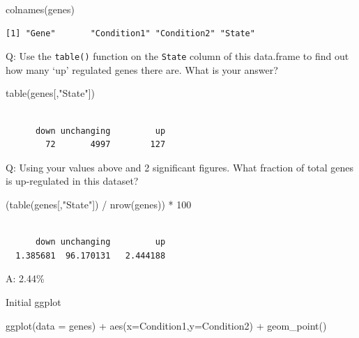 \documentclass[
  letterpaper,
  DIV=11,
  numbers=noendperiod]{scrartcl}
\newenvironment{Shaded}{\begin{snugshade}}{\end{snugshade}}
\newcommand{\AttributeTok}[1]{\textcolor[rgb]{0.40,0.45,0.13}{#1}}
\newcommand{\DecValTok}[1]{\textcolor[rgb]{0.68,0.00,0.00}{#1}}
\newcommand{\FunctionTok}[1]{\textcolor[rgb]{0.28,0.35,0.67}{#1}}
\newcommand{\NormalTok}[1]{\textcolor[rgb]{0.00,0.23,0.31}{#1}}
\newcommand{\SpecialCharTok}[1]{\textcolor[rgb]{0.37,0.37,0.37}{#1}}
\newcommand{\StringTok}[1]{\textcolor[rgb]{0.13,0.47,0.30}{#1}}
\begin{document}
\begin{Shaded}
\begin{Highlighting}[]
\FunctionTok{colnames}\NormalTok{(genes)}
\end{Highlighting}
\end{Shaded}

\begin{verbatim}
[1] "Gene"       "Condition1" "Condition2" "State"     
\end{verbatim}

Q: Use the \texttt{table()} function on the \texttt{State} column of
this data.frame to find out how many `up' regulated genes there are.
What is your answer?

\begin{Shaded}
\begin{Highlighting}[]
\FunctionTok{table}\NormalTok{(genes[,}\StringTok{"State"}\NormalTok{])}
\end{Highlighting}
\end{Shaded}

\begin{verbatim}

      down unchanging         up 
        72       4997        127 
\end{verbatim}

Q: Using your values above and 2 significant figures. What fraction of
total genes is up-regulated in this dataset?

\begin{Shaded}
\begin{Highlighting}[]
\NormalTok{(}\FunctionTok{table}\NormalTok{(genes[,}\StringTok{"State"}\NormalTok{]) }\SpecialCharTok{/} \FunctionTok{nrow}\NormalTok{(genes)) }\SpecialCharTok{*} \DecValTok{100}
\end{Highlighting}
\end{Shaded}

\begin{verbatim}

      down unchanging         up 
  1.385681  96.170131   2.444188 
\end{verbatim}

A: 2.44\%

Initial ggplot

\begin{Shaded}
\begin{Highlighting}[]
\FunctionTok{ggplot}\NormalTok{(}\AttributeTok{data =}\NormalTok{ genes) }\SpecialCharTok{+}
  \FunctionTok{aes}\NormalTok{(}\AttributeTok{x=}\NormalTok{Condition1,}\AttributeTok{y=}\NormalTok{Condition2) }\SpecialCharTok{+} 
  \FunctionTok{geom\_point}\NormalTok{() }
\end{Highlighting}
\end{Shaded}
\end{document}

